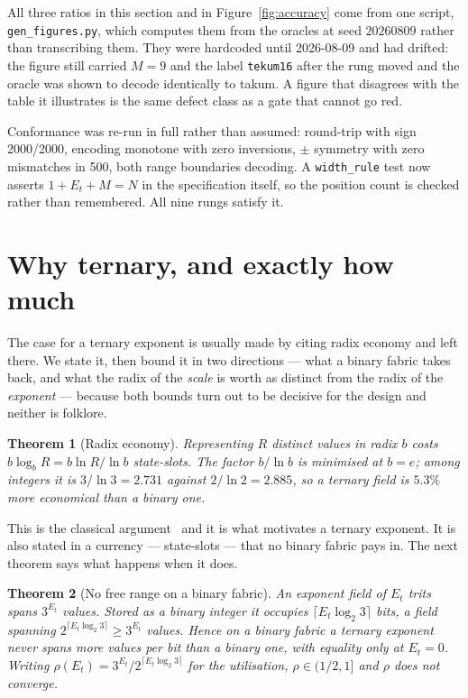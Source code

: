 \documentclass[11pt]{article}
\newtheorem{theorem}{Theorem}
\theoremstyle{definition}
\begin{document}
All three ratios in this section and in Figure~\ref{fig:accuracy} come from one
script, \texttt{gen\_figures.py}, which computes them from the oracles at seed
$20260809$ rather than transcribing them. They were hardcoded until 2026-08-09 and
had drifted: the figure still carried $M = 9$ and the label \texttt{tekum16} after
the rung moved and the oracle was shown to decode identically to takum. A figure
that disagrees with the table it illustrates is the same defect class as a gate
that cannot go red.

Conformance was re-run in full rather than assumed: round-trip with sign
2000/2000, encoding monotone with zero inversions, $\pm$ symmetry with zero
mismatches in 500, both range boundaries decoding. A \texttt{width\_rule} test now
asserts $1 + E_t + M = N$ in the specification itself, so the position count is
checked rather than remembered. All nine rungs satisfy it.

\section{Why ternary, and exactly how much}\label{sec:whyternary}

The case for a ternary exponent is usually made by citing radix economy and left
there. We state it, then bound it in two directions --- what a binary fabric takes
back, and what the radix of the \emph{scale} is worth as distinct from the radix
of the \emph{exponent} --- because both bounds turn out to be decisive for the
design and neither is folklore.

\begin{theorem}[Radix economy]
\label{thm:economy}
Representing $R$ distinct values in radix $b$ costs $b\log_b R = b\ln R/\ln b$
state-slots. The factor $b/\ln b$ is minimised at $b = e$; among integers it is
$3/\ln 3 = 2.731$ against $2/\ln 2 = 2.885$, so a ternary field is $5.3\%$ more
economical than a binary one.
\end{theorem}

This is the classical argument~\cite{hayes2001,radixeconomy} and it is what
motivates a ternary exponent. It is also stated in a currency --- state-slots ---
that no binary fabric pays in. The next theorem says what happens when it does.

\begin{theorem}[No free range on a binary fabric]
\label{thm:nofree}
An exponent field of $E_t$ trits spans $3^{E_t}$ values. Stored as a binary
integer it occupies $\lceil E_t\log_2 3\rceil$ bits, a field spanning
$2^{\lceil E_t\log_2 3\rceil} \geq 3^{E_t}$ values. Hence on a binary fabric a
ternary exponent never spans more values per bit than a binary one, with equality
only at $E_t = 0$. Writing $\rho(E_t) = 3^{E_t}/2^{\lceil E_t\log_2 3\rceil}$ for
the utilisation, $\rho \in (1/2, 1]$ and $\rho$ does not converge.
\end{theorem}
\end{document}
